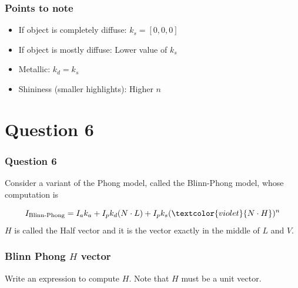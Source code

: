 \documentclass{beamer}
\begin{document}
\begin{frame}
    \frametitle{Points to note}

    \begin{itemize}
        \item If object is completely diffuse: $k_s = [0, 0, 0]$
        \item If object is mostly diffuse: Lower value of $k_s$
        \item Metallic: $k_d = k_s$
        \item Shininess (smaller highlights): Higher $n$
    \end{itemize}

\end{frame}

\section{Question 6}

\begin{frame}
    \frametitle{Question 6}

    Consider a variant of the Phong model, called the Blinn-Phong model, whose computation is 

    \begin{equation*}
        I_\text{Blinn-Phong} = I_a k_a + I_p k_d  (N \cdot L) + I_p k_s (\textcolor{violet}{N \cdot H})^n
    \end{equation*}
    $H$ is called the Half vector and it is the vector exactly in the middle of $L$ and $V$.

\end{frame}

\begin{frame}
    \frametitle{Blinn Phong $H$ vector}


    Write an expression to compute $H$. Note that $H$ must be a unit vector.

    \vspace*{2em}

\end{frame}
\end{document}
